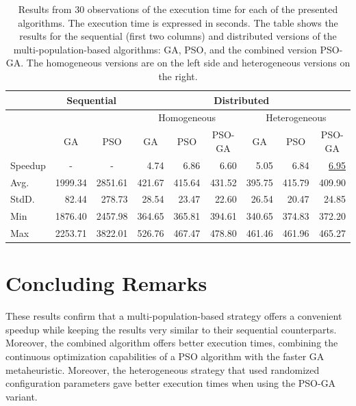 \documentclass[runningheads]{llncs}
\begin{document}
\begin{table}[]
\caption{
  Results %
  from 30 observations of the execution time for each of the
    presented algorithms. The execution time is expressed in seconds. The table
    shows the results for the sequential (first two columns) and distributed
    versions of the multi-population-based algorithms: GA, PSO, and the combined
    version PSO-GA. The homogeneous versions are on the left side and
    heterogeneous versions on the right.
    }\label{tab:speedup}
\renewcommand*{\arraystretch}{1.4}
\setlength{\tabcolsep}{5pt}
    \begin{small}
\begin{tabular}{lrrrrrrrr}
    \hline
				&  \multicolumn{2}{c}{Sequential} & \multicolumn{6}{c}{Distributed} \\
    \hline
    & &    & \multicolumn{3}{c}{Homogeneous} & \multicolumn{3}{c}{Heterogeneous} \\
    \cline{4-6} \cline{7-9}
       & \multicolumn{1}{c}{GA} & \multicolumn{1}{c}{PSO} &\multicolumn{1}{c}{GA} & \multicolumn{1}{c}{PSO} & \multicolumn{1}{c}{PSO-GA} &\multicolumn{1}{c}{GA} & \multicolumn{1}{c}{PSO} & \multicolumn{1}{c}{PSO-GA}\\
    \hline
    Speedup & \multicolumn{1}{c}{-} & \multicolumn{1}{c}{-} & 4.74 & 6.86 & 6.60 & 5.05 & 6.84 & \underline{6.95} \\
    \hline
Avg.   & 1999.34 & 2851.61 & 421.67 & 415.64 & 431.52 & 395.75 & 415.79 & 409.90 \\
    \hline
StdD.   & 82.44   & 278.73  & 28.54           & 23.47                    & 22.60           & 26.54           & 20.47           & 24.85    \\
    \hline
Min    & 1876.40 & 2457.98 & 364.65          & 365.81                   & 394.61          & 340.65          & 374.83          & 372.20   \\
    \hline
Max    & 2253.71 & 3822.01 & 526.76          & 467.47                   & 478.80          & 461.46          & 461.96          & 465.27  \\
    \hline
\end{tabular}
    \end{small}
\end{table}

\section{Concluding Remarks}

These results confirm that a multi-population-based strategy offers a convenient
speedup %
while keeping the results very similar to their sequential
counterparts. %
Moreover, the combined algorithm offers better %
execution times,
combining the continuous optimization capabilities of a PSO algorithm with the
faster GA metaheuristic. Moreover, the heterogeneous strategy that used
randomized configuration parameters gave better execution times when using the
PSO-GA variant.
\end{document}
